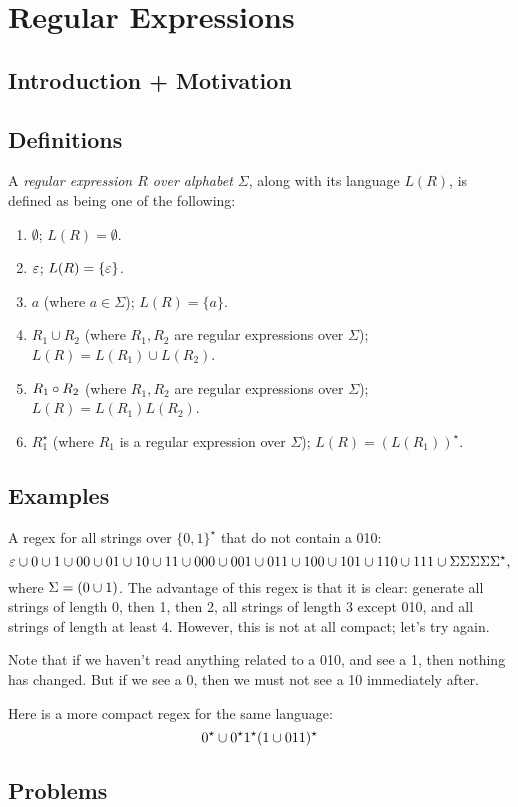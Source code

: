 \chapter{Regular Expressions}

\section{Introduction + Motivation}

\section{Definitions}

\begin{definition}
	A \textit{regular expression $R$ over alphabet $\Sigma$}, along with its language $L(R)$, is defined as being one of the following:
	\begin{enumerate}
		\item $\emptyset$; $L(R) = \emptyset$.
		\item $\varepsilon$; $L(R) = \{\varepsilon\}$.
		\item $a$ (where $a \in \Sigma$); $L(R) = \{a\}$.
		\item $R_1 \cup R_2$ (where $R_1, R_2$ are regular expressions over $\Sigma$); $L(R) = L(R_1) \cup L(R_2)$.
		\item $R_1 \circ R_2$ (where $R_1, R_2$ are regular expressions over $\Sigma$); $L(R) = L(R_1) L(R_2)$.
		\item $R_1^\star$ (where $R_1$ is a regular expression over $\Sigma$); $L(R) = (L(R_1))^\star$.
	\end{enumerate}

\end{definition}


\section{Examples}

A regex for all strings over $\{0,1\}^\star$ that do not contain a 010:
\[
	\varepsilon \cup 0 \cup 1 \cup 00 \cup 01 \cup 10 \cup 11 \cup 000 \cup 001 \cup 011 \cup 100 \cup 101 \cup 110 \cup 111 \cup \Sigma\Sigma\Sigma\Sigma\Sigma^\star,
\]
where $\Sigma = (0 \cup 1)$.
The advantage of this regex is that it is clear: generate all strings of length 0, then 1, then 2, all strings of length 3 except 010, and all strings of length at least 4.
However, this is not at all compact; let's try again.

Note that if we haven't read anything related to a 010, and see a 1, then nothing has changed. 
But if we see a 0, then we must not see a 10 immediately after. 

Here is a more compact regex for the same language:
\[
	 0^\star \cup 0^\star 1^\star (1 \cup 011)^\star
\]


\section{Problems}